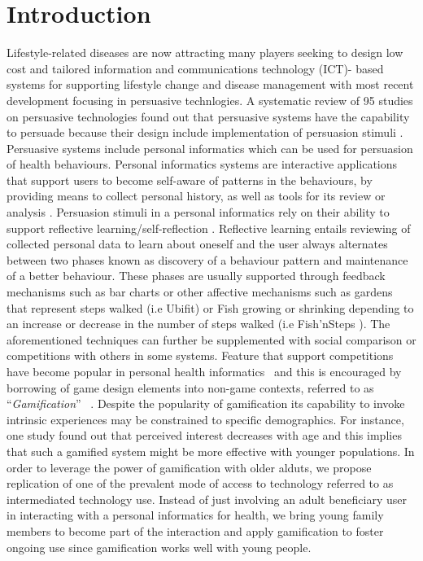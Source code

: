 \documentclass{sig-alternate}
\begin{document}
\section{Introduction} 
Lifestyle-related diseases are now attracting many players seeking to design low cost and tailored information and communications technology (ICT)- based systems for supporting lifestyle change and disease management\cite{arsand:mobile} with most recent development focusing in persuasive technlogies. A systematic review of 95 studies on persuasive technologies found out that persuasive systems have the capability to persuade because their design include implementation of persuasion stimuli \cite{hamari2014persuasive}.\newline
Persuasive systems include personal informatics which can be used for persuasion of health behaviours. Personal informatics systems are interactive applications that support users to become self-aware of patterns in the behaviours, by providing means to collect personal history, as well as tools for its review or analysis \cite{li2011:personal,li2012:personal}. Persuasion stimuli in a personal informatics rely on their ability to support reflective learning/self-reflection \cite{li2011:understanding}. Reflective learning entails reviewing of collected personal data to learn about oneself and the user always alternates between two phases known as discovery of a behaviour pattern and maintenance of a better behaviour\cite{li2011:understanding}. These phases are usually supported through feedback mechanisms such as bar charts or other affective mechanisms such as gardens that represent steps walked (i.e Ubifit\cite{klasnja2009:using}) or Fish growing or shrinking depending to an increase or decrease in the number of steps walked (i.e Fish'nSteps \cite{lin2006:fish}). The aforementioned techniques can further be supplemented with social comparison\cite{Oinas-kukkonen:psd} or competitions with others \cite{comber2013:designing} in some systems. Feature that support competitions have become popular in personal health informatics~\cite{hamari2014persuasive} and this is encouraged by borrowing of game design elements into non-game contexts, referred to as ``\emph{Gamification}'' ~\cite{deterding2011game}. \newline
Despite the popularity of gamification its capability to invoke intrinsic experiences may be constrained to specific demographics. For instance, one study found out that perceived interest decreases with age and this implies that such a gamified system might be more effective with younger populations\cite{v2014motivational}. In order to leverage the power of gamification with older alduts, we propose replication of one of the prevalent mode of access to technology referred to as intermediated technology use\cite{sambasivan2010}. Instead of just involving an adult beneficiary user in interacting with a personal informatics for health, we bring young family members to become part of the interaction and apply gamification to foster ongoing use since gamification works well with young people.\newline
\end{document}
